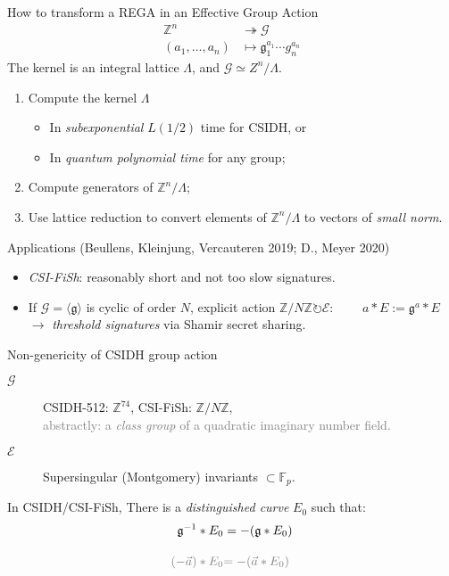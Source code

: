 \documentclass[aspectratio=169]{beamer}
\newcommand{\Z}{ℤ}
\newcommand{\F}{\mathbb{F}}
\newcommand{\g}{{\mathfrak{g}}}
\newcommand{\G}{{\mathcal{G}}}
\newcommand{\E}{{\mathcal{E}}}
\begin{document}
\begin{frame}{How to transform a REGA in an Effective Group Action}
  \begin{align*}
    \Z^n &\twoheadrightarrow \G\\
    (a_1,\ldots,a_n)&\mapsto \g_1^{a_1}\cdots g_n^{a_n}
  \end{align*}
  The kernel is an integral lattice $\Lambda$, and
  \emph{$\G \simeq Z^n/\Lambda$}.

  \begin{enumerate}
  \item Compute the kernel $\Lambda$
    \begin{itemize}
    \item In \emph{subexponential} $L(1/2)$ time for CSIDH, or
    \item In \emph{quantum polynomial time} for any group;
    \end{itemize}
  \item Compute generators of $\Z^n/\Lambda$;
  \item Use lattice reduction to convert elements of $\Z^n/\Lambda$ to
    vectors of \emph{small norm}.
  \end{enumerate}

  \pause
  \begin{block}{Applications \small(Beullens, Kleinjung, Vercauteren 2019; D., Meyer 2020)}
    \begin{itemize}
    \item \emph{CSI-FiSh}: reasonably short and not too slow signatures.
    \item If \emph{$\G=\langle\g\rangle$} is cyclic of order
      \emph{$N$}, explicit action \emph{$\Z/N\Z\circlearrowright\E$}:
      $\qquad a * E := \g^a * E$\\
      $\to$ \emph{threshold signatures} via Shamir secret sharing.
    \end{itemize}
  \end{block}
\end{frame}


\begin{frame}{Non-genericity of CSIDH group action}
  \begin{description}
  \item[$\G$] CSIDH-512: \emph{$\Z^{74}$}, CSI-FiSh: \emph{$\Z/N\Z$},\\
    \textcolor{gray}{abstractly: a \emph{class group} of a quadratic imaginary number
    field.}
  \item[$\E$] Supersingular (Montgomery) invariants \emph{$\subset \F_p$}.
  \end{description}

  \medskip
  In CSIDH/CSI-FiSh, There is a \emph{distinguished curve} $E_0$ such that:
  \begin{align*}
    \g^{-1} * E_0 &= -(\g * E_0)\\[1em]
    \textcolor{gray}{(-\vec{a}) * E_0} &\textcolor{gray}{= - (\vec{a} * E_0)}
  \end{align*}
\end{frame}
\end{document}
